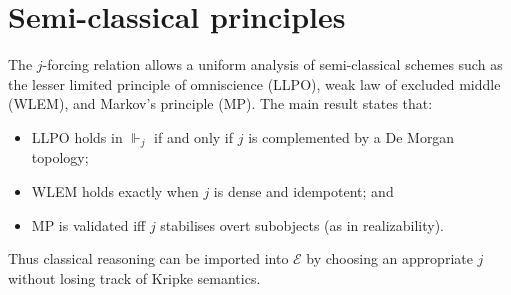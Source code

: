 \documentclass[12pt]{article}
\newcommand{\E}{\mathcal{E}}
\begin{document}
\section*{Semi-classical principles}
The $j$-forcing relation allows a uniform analysis of semi-classical schemes such as the lesser limited principle of omniscience (LLPO), weak law of excluded middle (WLEM), and Markov's principle (MP).  The main result states that:
\begin{itemize}
  \item LLPO holds in $\Vdash_j$ if and only if $j$ is complemented by a De Morgan topology;
  \item WLEM holds exactly when $j$ is dense and idempotent; and
  \item MP is validated iff $j$ stabilises overt subobjects (as in realizability).
\end{itemize}
Thus classical reasoning can be imported into $\E$ by choosing an appropriate $j$ without losing track of Kripke semantics.
\end{document}

